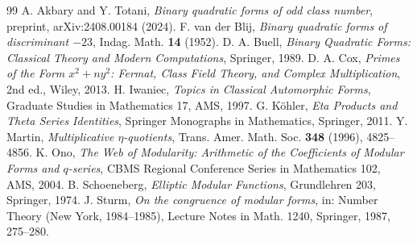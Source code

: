 \documentclass[11pt]{amsart}
\theoremstyle{definition}
\theoremstyle{remark}
\begin{document}
\begin{thebibliography}{99}
 A. Akbary and Y. Totani, \emph{Binary quadratic forms of odd class number}, preprint, arXiv:2408.00184 (2024).
 F. van der Blij, \emph{Binary quadratic forms of discriminant $-23$}, Indag. Math. \textbf{14} (1952).
 D. A. Buell, \emph{Binary Quadratic Forms: Classical Theory and Modern Computations}, Springer, 1989.
 D. A. Cox, \emph{Primes of the Form $x^2+ny^2$: Fermat, Class Field Theory, and Complex Multiplication}, 2nd ed., Wiley, 2013.
 H. Iwaniec, \emph{Topics in Classical Automorphic Forms}, Graduate Studies in Mathematics 17, AMS, 1997.
 G. K\"ohler, \emph{Eta Products and Theta Series Identities}, Springer Monographs in Mathematics, Springer, 2011.
 Y. Martin, \emph{Multiplicative $\eta$-quotients}, Trans. Amer. Math. Soc. \textbf{348} (1996), 4825--4856.
 K. Ono, \emph{The Web of Modularity: Arithmetic of the Coefficients of Modular Forms and $q$-series}, CBMS Regional Conference Series in Mathematics 102, AMS, 2004.
 B. Schoeneberg, \emph{Elliptic Modular Functions}, Grundlehren 203, Springer, 1974.
 J. Sturm, \emph{On the congruence of modular forms}, in: Number Theory (New York, 1984--1985), Lecture Notes in Math. 1240, Springer, 1987, 275--280.
\end{thebibliography}
\end{document}
